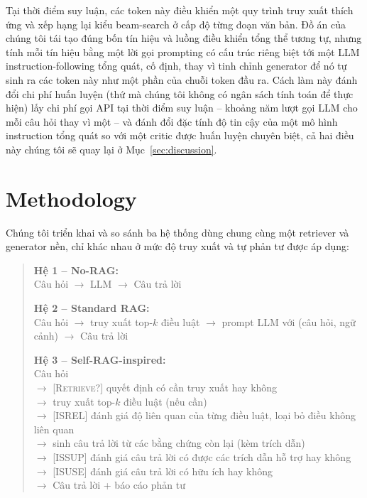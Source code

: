 \documentclass[11pt]{article}
\begin{document}
Tại thời điểm suy luận, các token này điều khiển một quy trình truy xuất thích ứng và xếp hạng lại kiểu beam-search ở cấp độ từng đoạn văn bản. Đồ án của chúng tôi tái tạo đúng bốn tín hiệu và luồng điều khiển tổng thể tương tự, nhưng tính mỗi tín hiệu bằng một lời gọi prompting có cấu trúc riêng biệt tới một LLM instruction-following tổng quát, cố định, thay vì tinh chỉnh generator để nó tự sinh ra các token này như một phần của chuỗi token đầu ra. Cách làm này đánh đổi chi phí huấn luyện (thứ mà chúng tôi không có ngân sách tính toán để thực hiện) lấy chi phí gọi API tại thời điểm suy luận -- khoảng năm lượt gọi LLM cho mỗi câu hỏi thay vì một -- và đánh đổi đặc tính độ tin cậy của một mô hình instruction tổng quát so với một critic được huấn luyện chuyên biệt, cả hai điều này chúng tôi sẽ quay lại ở Mục~\ref{sec:discussion}.

\section{Methodology}
\label{sec:method}

Chúng tôi triển khai và so sánh ba hệ thống dùng chung cùng một retriever và generator nền, chỉ khác nhau ở mức độ truy xuất và tự phản tư được áp dụng:

\begin{quote}
\small
\textbf{Hệ 1 -- No-RAG:}\\
Câu hỏi $\rightarrow$ LLM $\rightarrow$ Câu trả lời

\smallskip
\textbf{Hệ 2 -- Standard RAG:}\\
Câu hỏi $\rightarrow$ truy xuất top-$k$ điều luật $\rightarrow$ prompt LLM với (câu hỏi, ngữ cảnh) $\rightarrow$ Câu trả lời

\smallskip
\textbf{Hệ 3 -- Self-RAG-inspired:}\\
Câu hỏi\\
$\rightarrow$ [\textsc{Retrieve}?] quyết định có cần truy xuất hay không\\
$\rightarrow$ truy xuất top-$k$ điều luật (nếu cần)\\
$\rightarrow$ [\textsc{ISREL}] đánh giá độ liên quan của từng điều luật, loại bỏ điều không liên quan\\
$\rightarrow$ sinh câu trả lời từ các bằng chứng còn lại (kèm trích dẫn)\\
$\rightarrow$ [\textsc{ISSUP}] đánh giá câu trả lời có được các trích dẫn hỗ trợ hay không\\
$\rightarrow$ [\textsc{ISUSE}] đánh giá câu trả lời có hữu ích hay không\\
$\rightarrow$ Câu trả lời + báo cáo phản tư
\end{quote}
\end{document}
